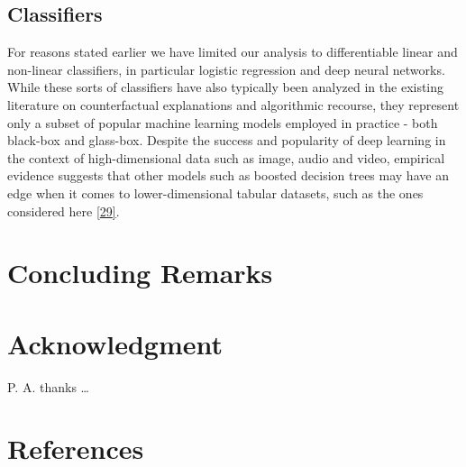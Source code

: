 \documentclass[
  conference]{IEEEtran}
\begin{document}
\hypertarget{classifiers}{%
\subsection{Classifiers}\label{classifiers}}

For reasons stated earlier we have limited our analysis to
differentiable linear and non-linear classifiers, in particular logistic
regression and deep neural networks. While these sorts of classifiers
have also typically been analyzed in the existing literature on
counterfactual explanations and algorithmic recourse, they represent
only a subset of popular machine learning models employed in practice -
both black-box and glass-box. Despite the success and popularity of deep
learning in the context of high-dimensional data such as image, audio
and video, empirical evidence suggests that other models such as boosted
decision trees may have an edge when it comes to lower-dimensional
tabular datasets, such as the ones considered here
\protect\hyperlink{ref-grinsztajn2022tree}{{[}29{]}}.

\hypertarget{sec-conclusion}{%
\section{Concluding Remarks}\label{sec-conclusion}}

\hypertarget{acknowledgment}{%
\section*{Acknowledgment}\label{acknowledgment}}

P. A. thanks \ldots{}

\pagebreak
\FloatBarrier

\hypertarget{references}{%
\section*{References}\label{references}}
\end{document}
